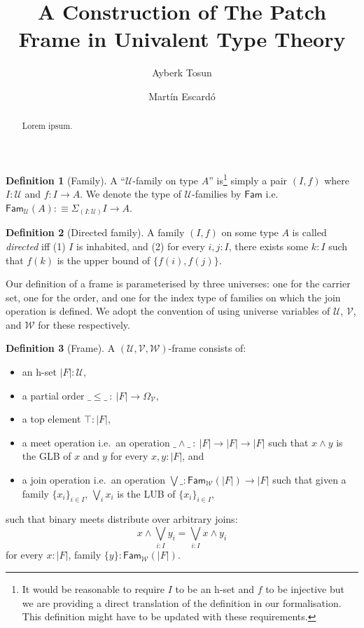 \documentclass[a4paper, 10pt]{article}
\title{A Construction of The Patch Frame in Univalent Type Theory}
\author{Ayberk Tosun \and Mart\'{i}n Escard\'{o}}
\theoremstyle{definition}
\newtheorem{defn}{Definition}
\newcommand{\UU}{\mathcal{U}}
\newcommand{\VV}{\mathcal{V}}
\newcommand{\WW}{\mathcal{W}}
\begin{document}
\maketitle

\begin{abstract}
  Lorem ipsum.
\end{abstract}

\begin{defn}[Family]
  A ``$\UU$-family on type $A$'' is\footnote{%
    It would be reasonable to require $I$ to be an h-set and $f$ to be injective but we are
    providing a direct translation of the definition in our formalisation. This definition might
    have to be updated with these requirements.
  }
  simply a pair $(I, f)$ where $I : \UU$ and $f : I \rightarrow A$. We denote the type of
  $\UU$-families by $\mathsf{Fam}$ i.e.\ $\mathsf{Fam}_{\UU}(A) :\equiv \Sigma_{(I : \UU)} I \rightarrow A$.
\end{defn}

\begin{defn}[Directed family]
  A family $(I, f)$ on some type $A$ is called \emph{directed} iff (1) $I$ is inhabited, and (2) for
  every $i, j : I$, there exists some $k : I$ such that $f(k)$ is the upper bound of
  $\{ f(i), f(j) \}$.
\end{defn}

Our definition of a frame is parameterised by three universes: one for the carrier set, one for the
order, and one for the index type of families on which the join operation is defined. We adopt the
convention of using universe variables of $\UU$, $\VV$, and $\WW$ for these respectively.

\begin{defn}[Frame]
  A $(\UU, \VV, \WW)$-frame consists of:
  \begin{itemize}
    \item an h-set $| F | : \UU$,
    \item a partial order $\_\le\_\ :\ | F | \rightarrow \Omega_\VV$,
    \item a top element $\top : | F |$,
    \item a meet operation i.e.\ an operation $\_\wedge\_\ :\ | F | \rightarrow | F | \rightarrow | F |$
      such that $x \wedge y$ is the GLB of $x$ and $y$ for every $x, y : | F |$, and
    \item a join operation i.e.\ an operation $\bigvee\_ : \mathsf{Fam}_{\WW}(| F |) \rightarrow
      | F |$ such that given a family $\{ x_i \}_{i \in I}$, $\bigvee_i x_i$ is the LUB
      of $\{ x_i \}_{i \in I}$,
  \end{itemize}
  such that binary meets distribute over arbitrary joins:
  \begin{equation*}
    x \wedge \bigvee_{i : I} y_i = \bigvee_{i : I} x \wedge y_i
  \end{equation*}
  for every $x : | F |$, family $\{ y \} : \mathsf{Fam}_{\WW}(| F |)$.
\end{defn}
\end{document}
